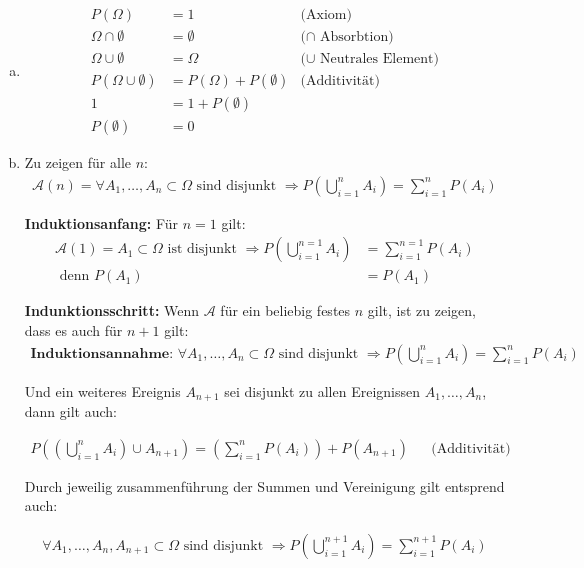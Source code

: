 \documentclass[parskip=half,a4paper]{scrartcl}
\begin{document}
\begin{enumerate}[(a)]
\item
\begin{align*}
    P(\Omega) &= 1 & \text{(Axiom)}\\
\Omega \cap \emptyset &= \emptyset & \text{($\cap$ Absorbtion)}\\
\Omega \cup \emptyset &= \Omega& \text{($\cup$ Neutrales Element)}\\
P(\Omega \cup \emptyset) &= P(\Omega) + P(\emptyset) & \text{(Additivität)}\\
1 &= 1 + P(\emptyset)\\
P(\emptyset) &= 0
\end{align*}

\item

Zu zeigen für alle $n$:
\begin{align*}
\mathcal{A}(n) = \forall A_1,\dots,A_n \subset \Omega \text{ sind disjunkt }\Rightarrow
P(\bigcup\limits_{i=1}^{n} A_i) = \sum\limits_{i=1}^{n} P(A_i)
\end{align*}

\textbf{Induktionsanfang:} Für $n = 1$ gilt:
\begin{align*}
\mathcal{A}(1) = A_1 \subset \Omega \text{ ist disjunkt }
\Rightarrow
P(\bigcup\limits_{i=1}^{n=1} A_i) &= \sum\limits_{i=1}^{n=1} P(A_i)\\
\text{ denn } P(A_1) &= P(A_1)
\end{align*}


\textbf{Indunktionsschritt:} Wenn $\mathcal{A}$ für ein beliebig festes $n$ gilt, ist zu zeigen, dass es auch für $n+1$ gilt:
\begin{align*}
\textbf{Induktionsannahme: } \forall A_1,\dots,A_n \subset \Omega \text{ sind disjunkt } \Rightarrow
P(\bigcup\limits_{i=1}^{n} A_i) = \sum\limits_{i=1}^{n} P(A_i)
\end{align*}

Und ein weiteres Ereignis $A_{n+1}$ sei disjunkt zu allen Ereignissen $A_1,\dots,A_n$, dann gilt auch:

\begin{align*}
P((\bigcup\limits_{i=1}^{n} A_i) \cup A_{n+1}) = (\sum\limits_{i=1}^{n} P(A_i)) + P(A_{n+1}) && \text{(Additivität)}
\end{align*}

Durch jeweilig zusammenführung der Summen und Vereinigung gilt entsprend auch:

\begin{align*}
\forall A_1,\dots,A_n,A_{n+1} \subset \Omega \text{ sind disjunkt }\Rightarrow
P(\bigcup\limits_{i=1}^{n+1} A_i) = \sum\limits_{i=1}^{n+1} P(A_i)
\end{align*}


\end{enumerate}
\end{document}
